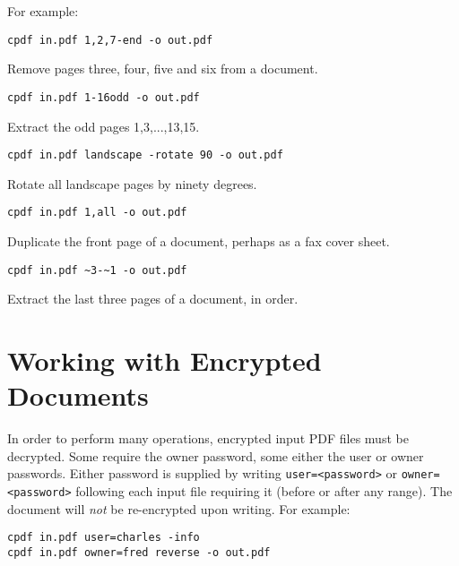 \documentclass{book}
\begin{document}
  \noindent For example:
  \begin{framed}
  \small\verb!cpdf in.pdf 1,2,7-end -o out.pdf!

  \vspace{2.5mm}
  \noindent Remove pages three, four, five and six from a document.

  \vspace{2.5mm}
  \verb!cpdf in.pdf 1-16odd -o out.pdf!

  \vspace{2.5mm}
  \noindent Extract the odd pages 1,3,...,13,15.
  
  \vspace{2.5mm}
  \verb!cpdf in.pdf landscape -rotate 90 -o out.pdf!

  \vspace{2.5mm}
  \noindent Rotate all landscape pages by ninety degrees.
    
  \vspace{2.5mm}
  \verb!cpdf in.pdf 1,all -o out.pdf!

  \vspace{2.5mm}
  \noindent Duplicate the front page of a document, perhaps as a fax cover sheet.

  \vspace{2.5mm}
  \verb!cpdf in.pdf ~3-~1 -o out.pdf!

  \vspace{2.5mm}
  \noindent Extract the last three pages of a document, in order.

  \end{framed}

  \section{Working with Encrypted Documents}
  In order to perform many operations, encrypted input PDF files must be
decrypted. Some require the owner password, some either the user or owner
passwords. Either password is supplied by writing \texttt{user=<password>} or
\texttt{owner=<password>} following each input file requiring it (before or
after any range). The document will \textit{not} be re-encrypted upon writing.  For
example:

\begin{framed}
\noindent\small\verb!cpdf in.pdf user=charles -info!\\
\noindent\small\verb!cpdf in.pdf owner=fred reverse -o out.pdf!
\end{framed}
\end{document}
